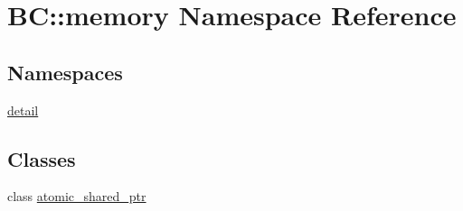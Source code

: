 \hypertarget{namespaceBC_1_1memory}{}\section{BC\+:\+:memory Namespace Reference}
\label{namespaceBC_1_1memory}
\subsection*{Namespaces}
\begin{DoxyCompactItemize}
\item 
 \hyperlink{namespaceBC_1_1memory_1_1detail}{detail}
\end{DoxyCompactItemize}
\subsection*{Classes}
\begin{DoxyCompactItemize}
\item 
class \hyperlink{classBC_1_1memory_1_1atomic__shared__ptr}{atomic\+\_\+shared\+\_\+ptr}
\end{DoxyCompactItemize}
